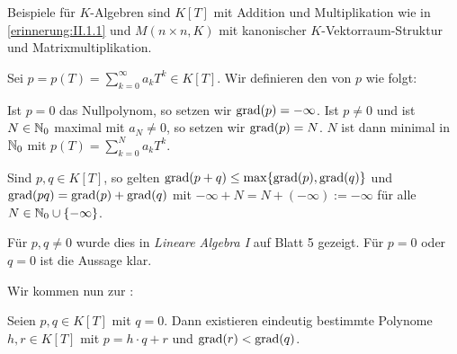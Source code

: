 Beispiele für $K$-Algebren sind $K[T]$ mit Addition und Multiplikation wie in \ref{erinnerung:II.1.1} und $M(n\times n,K)$ mit kanonischer $K$-Vektorraum-Struktur und Matrixmultiplikation.

\begin{definition}[Grad]
	\label{def:II.1.3}
	Sei $p = p(T) = \sum_{k=0}^{\infty} a_k T^{k} \in K[T]$.
	Wir definieren den  von $p$ wie folgt:
	
	Ist $p = 0$ das Nullpolynom, so setzen wir $\operatorname{grad}(p) = -\infty$.
	Ist $p \neq 0$ und ist $N \in \mathbb{N}_0$ maximal mit $a_N \neq 0$, so setzen wir $\operatorname{grad}(p) = N$.
	$N$ ist dann minimal in $\mathbb{N}_0$ mit $p(T) = \sum_{k=0}^{N} a_k T^{k}$.
\end{definition}

\begin{lemma}
	\label{lemma:II.1.4}
	Sind $p,q \in K[T]$, so gelten $\operatorname{grad}(p+q) \leq \max\{\operatorname{grad}(p),\operatorname{grad}(q)\}$ und $\operatorname{grad}(pq) = \operatorname{grad}(p)+\operatorname{grad}(q)$ mit $-\infty + N = N + (-\infty) := -\infty$ für alle $N \in \mathbb{N}_0 \cup \{-\infty\}$.
\end{lemma}

\begin{beweis}
	Für $p,q \neq 0$ wurde dies in \textit{Lineare Algebra I} auf Blatt 5 gezeigt.
	Für $p = 0$ oder $q=0$ ist die Aussage klar. \qedhere
\end{beweis}

Wir kommen nun zur :
\begin{satz}
	\label{satz:II.1.5}
	Seien $p,q \in K[T]$ mit $q=0$.
	Dann existieren eindeutig bestimmte Polynome $h,r \in K[T]$ mit $p=h\cdot q+r$ und $\operatorname{grad}(r) < \operatorname{grad}(q)$.
\end{satz}

